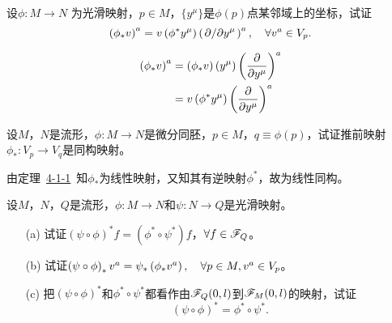 \begin{xiti}
	\item 设$\phi\colon M\rightarrow N$ 为光滑映射，$p \in M $，$\{ y^\mu \}$是$\phi(p)$点某邻域上的坐标，试证
	\begin{displaymath}
	\tensor{\left(\phi_* v\right)}{^a}= v \left( \phi^* y^\mu \right) \tensor{\left(\pd{y^\mu}\right)}{^a}\qc \forall \tensor{v}{^a} \in V_p.
	\end{displaymath}

	\begin{zm}
		\begin{align*}
		\tensor{\left(\phi_* v\right)}{^a}&= \left(\phi_* v\right) (y^\mu) \tensor{\left(\pdv{y^\mu}\right)}{^a}\\
		&=v \left(\phi^* y^\mu\right) \tensor{\left(\pdv{y^\mu}\right)}{^a}
		\end{align*}
	\end{zm}

	\item 设$M$，$N$是流形，$\phi\colon M\rightarrow N$是微分同胚，$p\in M$，$q\equiv \phi(p)$，试证推前映射$\phi_* \colon V_p \rightarrow V_q $是同构映射。

	\begin{zm}
	由定理~\hyperlink{thm4.1.1}{4-1-1}~知$\phi_*$为线性映射，又知其有逆映射$\phi^*$，故为线性同构。
	\end{zm}

	\item 设$M$，$N$，$Q$是流形，$\phi\colon M \rightarrow N $和$\psi \colon N \rightarrow Q $是光滑映射。
	\begin{enumerate}
		\item[(a)] 试证$\left( \psi \circ \phi \right)^* f= \left(\phi^* \circ \psi^* \right) f $，$\forall f\in \mathscr{F}_Q $。
		\item[(b)] 试证$\left(\psi \circ \phi \right)_* \tensor{v}{^a}= \psi_*\left( \phi_* \tensor{v}{^a} \right) \qc \forall p\in M,\tensor{v}{^a}\in V_p $。
		\item[(c)] \hypertarget{4.5.c}{}把$\left( \psi \circ \phi \right)^* $和$\phi^* \circ \psi^* $都看作由$\mathscr{F}_Q(0,l) $到$\mathscr{F}_M(0,l) $的映射，试证\[ \left( \psi \circ \phi \right)^*= \phi^* \circ \psi^*. \]
	\end{enumerate}


\end{xiti}
